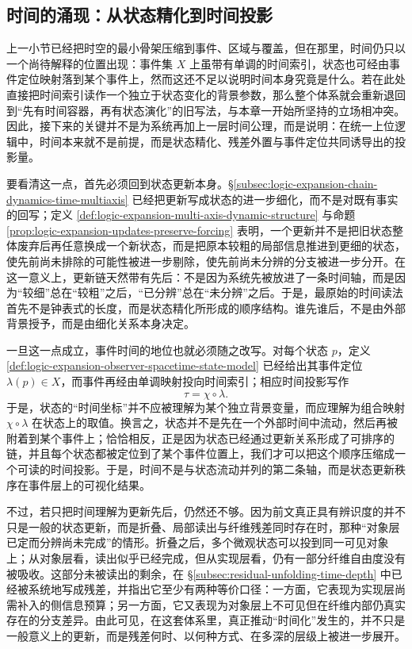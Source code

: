 \subsection{时间的涌现：从状态精化到时间投影}\label{subsec:physical-spacetime-skeleton-time-projection}

上一小节已经把时空的最小骨架压缩到事件、区域与覆盖，但在那里，时间仍只以一个尚待解释的位置出现：事件集 \(X\) 上虽带有单调的时间索引，状态也可经由事件定位映射落到某个事件上，然而这还不足以说明时间本身究竟是什么。若在此处直接把时间索引读作一个独立于状态变化的背景参数，那么整个体系就会重新退回到“先有时间容器，再有状态演化”的旧写法，与本章一开始所坚持的立场相冲突。因此，接下来的关键并不是为系统再加上一层时间公理，而是说明：在统一上位逻辑中，时间本来就不是前提，而是状态精化、残差外置与事件定位共同诱导出的投影量。

要看清这一点，首先必须回到状态更新本身。\S\ref{subsec:logic-expansion-chain-dynamics-time-multiaxis} 已经把更新写成状态的进一步细化，而不是对既有事实的回写；定义 \ref{def:logic-expansion-multi-axis-dynamic-structure} 与命题 \ref{prop:logic-expansion-updates-preserve-forcing} 表明，一个更新并不是把旧状态整体废弃后再任意换成一个新状态，而是把原本较粗的局部信息推进到更细的状态，使先前尚未排除的可能性被进一步剔除，使先前尚未分辨的分支被进一步分开。在这一意义上，更新链天然带有先后：不是因为系统先被放进了一条时间轴，而是因为“较细”总在“较粗”之后，“已分辨”总在“未分辨”之后。于是，最原始的时间读法首先不是钟表式的长度，而是状态精化所形成的顺序结构。谁先谁后，不是由外部背景授予，而是由细化关系本身决定。

一旦这一点成立，事件时间的地位也就必须随之改写。对每个状态 \(p\)，定义 \ref{def:logic-expansion-observer-spacetime-state-model} 已经给出其事件定位 \(\lambda(p)\in X\)，而事件再经由单调映射投向时间索引；相应时间投影写作
\[
\tau=\chi\circ\lambda.
\]
于是，状态的“时间坐标”并不应被理解为某个独立背景变量，而应理解为组合映射 \(\chi\circ\lambda\) 在状态上的取值。换言之，状态并不是先在一个外部时间中流动，然后再被附着到某个事件上；恰恰相反，正是因为状态已经通过更新关系形成了可排序的链，并且每个状态都被定位到了某个事件位置上，我们才可以把这个顺序压缩成一个可读的时间投影。于是，时间不是与状态流动并列的第二条轴，而是状态更新秩序在事件层上的可视化结果。

不过，若只把时间理解为更新先后，仍然还不够。因为前文真正具有辨识度的并不只是一般的状态更新，而是折叠、局部读出与纤维残差同时存在时，那种“对象层已定而分辨尚未完成”的情形。折叠之后，多个微观状态可以投到同一可见对象上；从对象层看，读出似乎已经完成，但从实现层看，仍有一部分纤维自由度没有被吸收。这部分未被读出的剩余，在 \S\ref{subsec:residual-unfolding-time-depth} 中已经被系统地写成残差，并指出它至少有两种等价口径：一方面，它表现为实现层尚需补入的侧信息预算；另一方面，它又表现为对象层上不可见但在纤维内部仍真实存在的分支差异。由此可见，在这套体系里，真正推动“时间化”发生的，并不只是一般意义上的更新，而是残差何时、以何种方式、在多深的层级上被进一步展开。


